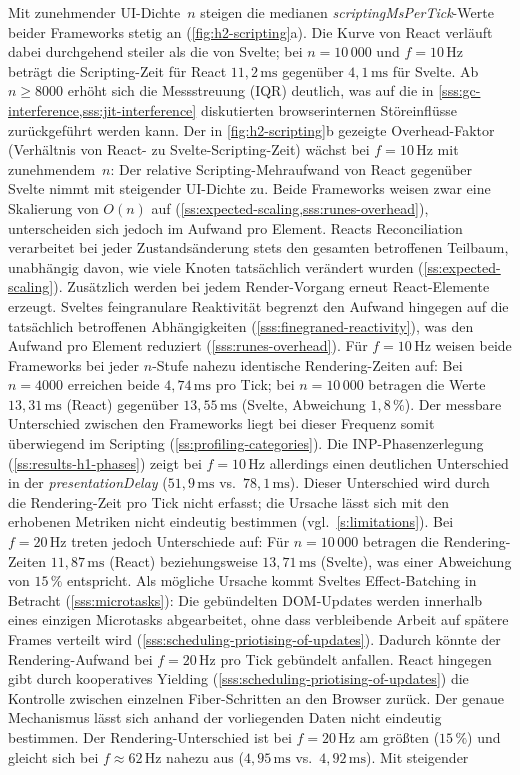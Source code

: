 Mit zunehmender UI-Dichte~$n$ steigen die medianen \textit{scriptingMsPerTick}-Werte beider Frameworks stetig an (\cref{fig:h2-scripting}a). Die Kurve von React verläuft dabei durchgehend steiler als die von Svelte; bei $n = 10\,000$ und $f = 10\,\text{Hz}$ beträgt die Scripting-Zeit für React $11{,}2\,\text{ms}$ gegenüber $4{,}1\,\text{ms}$ für Svelte. Ab $n \geq 8000$ erhöht sich die Messstreuung (IQR) deutlich, was auf die in \cref{sss:gc-interference,sss:jit-interference} diskutierten browserinternen Störeinflüsse zurückgeführt werden kann. Der in \cref{fig:h2-scripting}b gezeigte Overhead-Faktor (Verhältnis von React- zu Svelte-Scripting-Zeit) wächst bei $f = 10\,\text{Hz}$ mit zunehmendem~$n$: Der relative Scripting-Mehraufwand von React gegenüber Svelte nimmt mit steigender UI-Dichte zu. Beide Frameworks weisen zwar eine Skalierung von $O(n)$ auf (\cref{ss:expected-scaling,sss:runes-overhead}), unterscheiden sich jedoch im Aufwand pro Element. Reacts Reconciliation verarbeitet bei jeder Zustandsänderung stets den gesamten betroffenen Teilbaum, unabhängig davon, wie viele Knoten tatsächlich verändert wurden (\cref{ss:expected-scaling}). Zusätzlich werden bei jedem Render-Vorgang erneut React-Elemente erzeugt. Sveltes feingranulare Reaktivität begrenzt den Aufwand hingegen auf die tatsächlich betroffenen Abhängigkeiten (\cref{sss:finegraned-reactivity}), was den Aufwand pro Element reduziert (\cref{sss:runes-overhead}). Für $f = 10\,\text{Hz}$ weisen beide Frameworks bei jeder $n$-Stufe nahezu identische Rendering-Zeiten auf: Bei $n = 4000$ erreichen beide $4{,}74\,\text{ms}$ pro Tick; bei $n = 10\,000$ betragen die Werte $13{,}31\,\text{ms}$ (React) gegenüber $13{,}55\,\text{ms}$ (Svelte, Abweichung $1{,}8\,\%$). Der messbare Unterschied zwischen den Frameworks liegt bei dieser Frequenz somit überwiegend im Scripting (\cref{ss:profiling-categories}). Die INP-Phasenzerlegung (\cref{ss:results-h1-phases}) zeigt bei $f = 10\,\text{Hz}$ allerdings einen deutlichen Unterschied in der \textit{presentationDelay} ($51{,}9\,\text{ms}$ vs.\ $78{,}1\,\text{ms}$). Dieser Unterschied wird durch die Rendering-Zeit pro Tick nicht erfasst; die Ursache lässt sich mit den erhobenen Metriken nicht eindeutig bestimmen (vgl.~\cref{s:limitations}). Bei $f = 20\,\text{Hz}$ treten jedoch Unterschiede auf: Für $n = 10\,000$ betragen die Rendering-Zeiten $11{,}87\,\text{ms}$ (React) beziehungsweise $13{,}71\,\text{ms}$ (Svelte), was einer Abweichung von $15\,\%$ entspricht. Als mögliche Ursache kommt Sveltes Effect-Batching in Betracht (\cref{sss:microtasks}): Die gebündelten DOM-Updates werden innerhalb eines einzigen Microtasks abgearbeitet, ohne dass verbleibende Arbeit auf spätere Frames verteilt wird (\cref{sss:scheduling-priotising-of-updates}). Dadurch könnte der Rendering-Aufwand bei $f = 20\,\text{Hz}$ pro Tick gebündelt anfallen. React hingegen gibt durch kooperatives Yielding (\cref{sss:scheduling-priotising-of-updates}) die Kontrolle zwischen einzelnen Fiber-Schritten an den Browser zurück. Der genaue Mechanismus lässt sich anhand der vorliegenden Daten nicht eindeutig bestimmen. Der Rendering-Unterschied ist bei $f = 20\,\text{Hz}$ am größten ($15\,\%$) und gleicht sich bei $f \approx 62\,\text{Hz}$ nahezu aus ($4{,}95\,\text{ms}$ vs.\ $4{,}92\,\text{ms}$). Mit steigender 